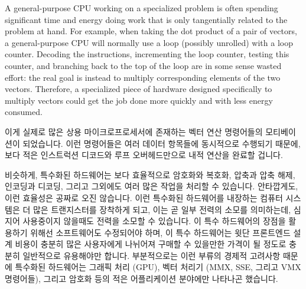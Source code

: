 A general-purpose CPU working on a specialized problem is often spending
significant time and energy doing work that is only tangentially related
to the problem at hand.
For example, when taking the dot product of a pair of vectors, a
general-purpose CPU will normally use a loop (possibly unrolled)
with a loop counter.
Decoding the instructions, incrementing the loop counter, testing this
counter, and branching back to the
top of the loop are in some sense wasted effort: the real goal is
instead to multiply corresponding elements of the two vectors.
Therefore, a specialized piece of hardware designed specifically to
multiply vectors could get the job done more quickly and with less
energy consumed.
\fi

이게 실제로 많은 상용 마이크로프로세서에 존재하는 벡터 연산 명령어들의
모티베이션이 되었습니다.
이런 명령어들은 여러 데이터 항목들에 동시적으로 수행되기 때문에, 보다 적은
인스트럭션 디코드와 루프 오버헤드만으로 내적 연산을 완료할 겁니다.
\iffalse

This is in fact the motivation for the vector instructions present in
many commodity microprocessors.
Because these instructions operate on multiple data items simultaneously,
they would permit a dot product to be computed with less instruction-decode
and loop overhead.
\fi

비슷하게, 특수화된 하드웨어는 보다 효율적으로 암호화와 복호화, 압축과 압축
해제, 인코딩과 디코딩, 그리고 그외에도 여러 많은 작업을 처리할 수 있습니다.
안타깝게도, 이런 효율성은 공짜로 오진 않습니다.
이런 특수화된 하드웨어를 내장하는 컴퓨터 시스템은 더 많은 트랜지스터를 장착하게
되고, 이는 곧 일부 전력의 소모를 의미하는데, 심지어 사용중이지 않을때도 전력을
소모할 수 있습니다.
이 특수 하드웨어의 장점을 활용하기 위해선 소프트웨어도 수정되어야 하며,
이 특수 하드웨어는 윗단 프론트엔드 설계 비용이 충분히 많은 사용자에게 나뉘어져
구매할 수 있을만한 가격이 될 정도로 충분히 일반적으로 유용해야만 합니다.
부분적으로는 이런 부류의 경제적 고려사항 때문에 특수화된 하드웨어는 그래픽 처리
(GPU), 벡터 처리기 (MMX, SSE, 그리고 VMX 명령어들), 그리고 암호화 등의 적은
어플리케이션 분야에만 나타나곤 했습니다.
\iffalse

Similarly, specialized hardware can more efficiently encrypt and decrypt,
compress and decompress, encode and decode, and many other tasks besides.
Unfortunately, this efficiency does not come for free.
A computer system incorporating this specialized hardware will contain
more transistors, which will consume some power even when not in use.
Software must be modified to take advantage of this specialized hardware,
and this specialized hardware must be sufficiently generally useful
that the high up-front hardware-design costs can be spread over enough
users to make the specialized hardware affordable.
In part due to these sorts of economic considerations, specialized
hardware has thus far appeared only for a few application areas,
including graphics processing (GPUs), vector processors (MMX, SSE,
and VMX instructions), and, to a lesser extent, encryption.
\fi

